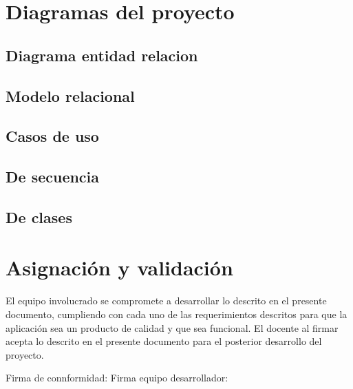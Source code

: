 \documentclass[12pt,a4paper]{article}
\begin{document}
	\section{Diagramas del proyecto}
	\subsection{Diagrama entidad relacion}
	\subsection{Modelo relacional}
	\subsection{Casos de uso}
	\subsection{De secuencia}
	\subsection{De clases}

	

	\section{Asignación y validación}
	El equipo involucrado se compromete a desarrollar lo descrito en el presente documento, cumpliendo con cada uno de las requerimientos descritos para que la aplicación sea un producto de calidad y que sea funcional.\linebreak  
	El docente al firmar acepta lo descrito en el presente documento para el posterior desarrollo del proyecto.\linebreak\linebreak   
	
	Firma de connformidad: \underline{\hspace{4cm}}\linebreak\linebreak 
	Firma equipo desarrollador: \underline{\hspace{4cm}}\linebreak 
	
\end{document}
